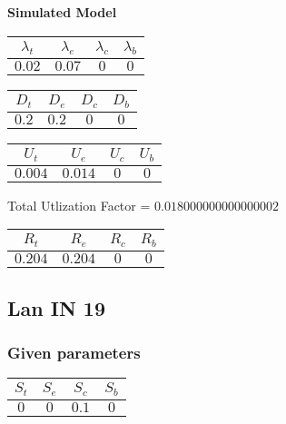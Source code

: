 \documentclass{article}
\begin{document}
\begin{minipage}{0.5\textwidth}
\centering	\textbf{Simulated Model}
\begin{table}[H]
\centering
\begin{tabular}{@{}cccc@{}}
\toprule
$\lambda_t$ & $\lambda_e$ & $\lambda_c$ & $\lambda_b$\\
\midrule
$0.02$ & $0.07$ & $0$ & $0$\\
\bottomrule
\end{tabular}
\end{table}
\begin{table}[H]
\centering
\begin{tabular}{@{}cccc@{}}
\toprule
$D_t$ & $D_e$ & $D_c$ & $D_b$\\
\midrule
$0.2$ & $0.2$ & $0$ & $0$\\
\bottomrule
\end{tabular}
\end{table}\begin{table}[H]
\centering
\begin{tabular}{@{}cccc@{}}
\toprule
$U_t$ & $U_e$ & $U_c$ & $U_b$\\
\midrule
$0.004$ & $0.014$ & $0$ & $0$\\
\bottomrule
\end{tabular}
\end{table}
\centering Total Utlization Factor = $0.018000000000000002$
\begin{table}[H]
\centering
\begin{tabular}{@{}cccc@{}}
\toprule
$R_t$ & $R_e$ & $R_c$ & $R_b$\\
\midrule
$0.204$ & $0.204$ & $0$ & $0$\\
\bottomrule
\end{tabular}
\end{table}
\end{minipage}\subsection{Lan IN 19}
\subsubsection{Given parameters}
\begin{table}[H]
\centering
\begin{tabular}{@{}cccc@{}}
\toprule
$S_t$ & $S_e$ & $S_c$ & $S_b$\\
\midrule
$0$ & $0$ & $0.1$ & $0$\\
\bottomrule
\end{tabular}
\end{table}
\end{document}
